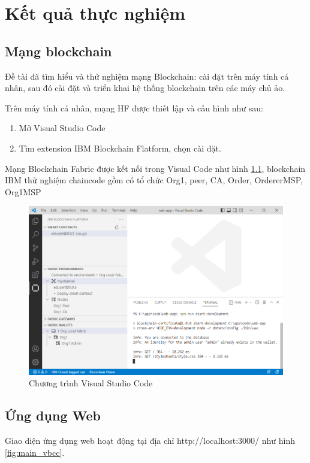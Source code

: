 \chapter{Kết quả thực nghiệm}
\section{Mạng blockchain}
Đề tài đã tìm hiểu và thử nghiệm mạng Blockchain: cài đặt trên máy tính cá nhân, sau đó cài đặt và triển khai hệ thống blockchain trên các máy chủ ảo.

Trên máy tính cá nhân, mạng HF được thiết lập và cấu hình như sau:
\begin{enumerate}
\item Mở Visual Studio Code 
\item Tìm extension IBM Blockchain Flatform, chọn cài đặt.
\end{enumerate}
Mạng Blockchain Fabric được kết nối trong Visual Code như hình \ref{fig:ide_start}, blockchain IBM thử nghiệm chaincode gồm có tổ chức Org1, peer, CA, Order, OrdererMSP, Org1MSP

\begin{figure}[htbp]
\centering
\includegraphics[width=.9\linewidth]{img/ide_start.PNG}
\caption{Chương trình Visual Studio Code}
\label{fig:ide_start}
\end{figure}

\section{Ứng dụng Web}

Giao diện ứng dụng web hoạt động tại địa chỉ http://localhost:3000/ như hình \ref{fig:main_vbcc}. 


